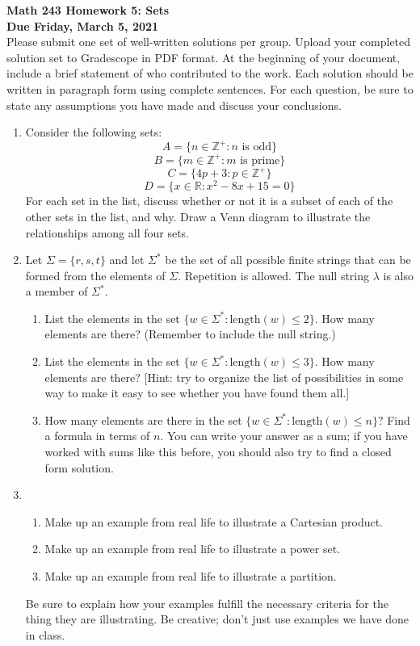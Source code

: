 \documentclass{article}
\begin{document}
\noindent\textbf{Math 243 \hfill Homework 5: Sets}\\[0.0625in]
\mbox{}{\textbf{Due Friday, March 5, 2021}}\hfill\\

Please submit one set of well-written solutions per group.  Upload your completed solution set to Gradescope in PDF format. At the beginning of your document, include a brief statement of who contributed to the work.  Each solution should be written in paragraph form using complete sentences.  For each question, be sure to state any assumptions you have made and discuss your conclusions. 

\begin{enumerate} 

\item Consider the following sets:
$$A=\{n\in \mathbb{Z^+}:n \textrm{ is odd}\} $$
$$B=\{m\in \mathbb{Z^+}:m \textrm{ is prime}\} $$
$$C=\{4p+3:p\in \mathbb{Z^+}\} $$
$$D=\{x\in \mathbb{R}:x^2-8x+15=0\} $$
For each set in the list, discuss whether or not it is a subset of each of the other sets in the list, and why.  Draw a Venn diagram to illustrate the relationships among all four sets.

\item Let $\Sigma=\{r,s,t\}$ and let $\Sigma^*$ be the set of all possible finite strings that can be formed from the elements of $\Sigma$.  Repetition is allowed. The null string $\lambda$ is also a member of $\Sigma^*$.
\begin{enumerate}
	\item List the elements in the set $\{ w \in \Sigma ^* :\textrm{length}(w) \leq 2\}.$ How many elements are there?  (Remember to include the null string.)
	\item List the elements in the set $\{ w \in \Sigma ^* :\textrm{length}(w) \leq 3\}.$ How many elements are there? [Hint: try to organize the list of possibilities in some way to make it easy to see whether you have found them all.]
	\item How many elements are there in the set $\{ w \in \Sigma^*:\textrm{length}(w) \leq n\}?$  Find a formula in terms of $n$.  You can write your answer as a sum; if you have worked with sums like this before, you should also try to find a closed form solution. 
\end{enumerate}

\item \begin{enumerate}
	\item Make up an example from real life to illustrate a Cartesian product.  
	\item Make up an example from real life to illustrate a power set.  
	\item Make up an example from real life to illustrate a partition.
\end{enumerate}

Be sure to explain how your examples fulfill the necessary criteria for the thing they are illustrating.  Be creative; don't just use examples we have done in class.


\end{enumerate}
\end{document}
